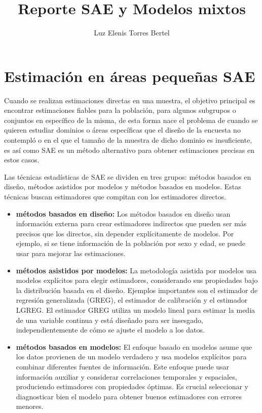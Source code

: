 \documentclass[12pt,spanish]{article}
\title{Reporte SAE y Modelos mixtos}
\author{Luz Elenis Torres Bertel}
\date{}
\begin{document}
\maketitle

\section*{Estimación en áreas pequeñas SAE}

Cuando se realizan estimaciones directas en una muestra, el objetivo principal es encontrar estimaciones fiables para la población, para algunos subgrupos o conjuntos en específico de la misma, de esta forma nace el problema de cuando se quieren estudiar dominios o áreas específicas que el diseño de la encuesta no contempló o en el que el tamaño de la muestra de dicho dominio es insuficiente, es así como SAE es un método alternativo para obtener estimaciones precisas en estos casos.

Las técnicas estadísticas de SAE se dividen en tres grupos: métodos basados en diseño, métodos asistidos por modelos y métodos basados en modelos. Estas técnicas buscan estimadores que compitan con los estimadores directos.  

\begin{itemize}
    \item \textbf{métodos basados en diseño:}
    Los métodos basados en diseño usan información externa para crear estimadores indirectos que pueden ser más precisos que los directos, sin depender explícitamente de modelos. Por ejemplo, si se tiene información de la población por sexo y edad, se puede usar para mejorar las estimaciones.
    \item \textbf{métodos asistidos por modelos:}
    La metodología asistida por modelos usa modelos explícitos para elegir estimadores, considerando sus propiedades bajo la distribución basada en el diseño. Ejemplos importantes son el estimador de regresión generalizada (GREG), el estimador de calibración y el estimador LGREG. El estimador GREG utiliza un modelo lineal para estimar la media de una variable continua y está diseñado para ser insesgado, independientemente de cómo se ajuste el modelo a los datos.
    \item \textbf{métodos basados en modelos:}
    El enfoque basado en modelos asume que los datos provienen de un modelo verdadero y usa modelos explícitos para combinar diferentes fuentes de información. Este enfoque puede usar información auxiliar y considerar correlaciones temporales y espaciales, produciendo estimadores con propiedades óptimas. Es crucial seleccionar y diagnosticar bien el modelo para obtener buenos estimadores con errores menores. 
\end{itemize}
\end{document}
